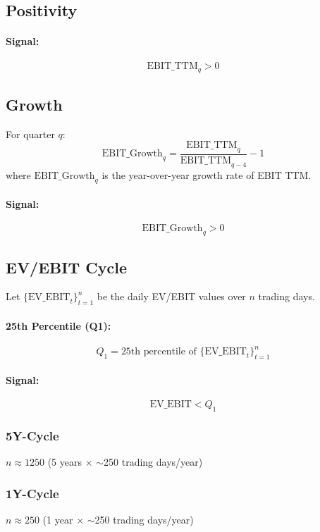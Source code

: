 \documentclass{article}
\begin{document}
\subsection{Positivity}

\paragraph{Signal:}
\[
    \text{EBIT\_TTM}_q > 0
\]

\subsection{Growth}

For quarter $q$:
\[
    \text{EBIT\_Growth}_q = \frac{\text{EBIT\_TTM}_q}{\text{EBIT\_TTM}_{q-4}} - 1
\]
where $\text{EBIT\_Growth}_q$ is the year-over-year growth rate of EBIT TTM.

\paragraph{Signal:}
\[
    \text{EBIT\_Growth}_q > 0
\]

\subsection{EV/EBIT Cycle}

Let $\{\text{EV\_EBIT}_t\}_{t=1}^{n}$ be the daily EV/EBIT values over $n$ trading days.

\paragraph{25th Percentile (Q1):}
\[
    Q_1 = \text{25th percentile of } \{\text{EV\_EBIT}_t\}_{t=1}^{n}
\]

\paragraph{Signal:}
\[
    \text{EV\_EBIT} < Q_1
\]

\subsubsection{5Y-Cycle}
$n \approx 1250$ (5 years $\times$ $\sim$250 trading days/year)

\subsubsection{1Y-Cycle}
$n \approx 250$ (1 year $\times$ $\sim$250 trading days/year)
\end{document}
